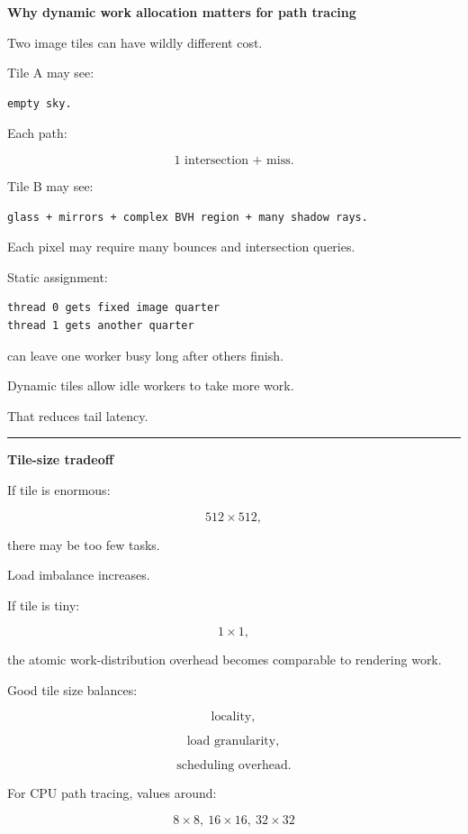 \textbf{Why dynamic work allocation matters for path tracing}

Two image tiles can have wildly different cost.

Tile A may see:

\begin{verbatim}
empty sky.
\end{verbatim}

Each path:

\[
1\text{ intersection + miss}.
\]

Tile B may see:

\begin{verbatim}
glass + mirrors + complex BVH region + many shadow rays.
\end{verbatim}

Each pixel may require many bounces and intersection queries.

Static assignment:

\begin{verbatim}
thread 0 gets fixed image quarter
thread 1 gets another quarter
\end{verbatim}

can leave one worker busy long after others finish.

Dynamic tiles allow idle workers to take more work.

That reduces tail latency.

\begin{center}\rule{0.5\linewidth}{0.5pt}\end{center}

\textbf{Tile-size tradeoff}

If tile is enormous:

\[
512\times512,
\]

there may be too few tasks.

Load imbalance increases.

If tile is tiny:

\[
1\times1,
\]

the atomic work-distribution overhead becomes comparable to rendering work.

Good tile size balances:

\[
\text{locality},
\]

\[
\text{load granularity},
\]

\[
\text{scheduling overhead}.
\]

For CPU path tracing, values around:

\[
8\times8,
\ 16\times16,
\ 32\times32
\]


